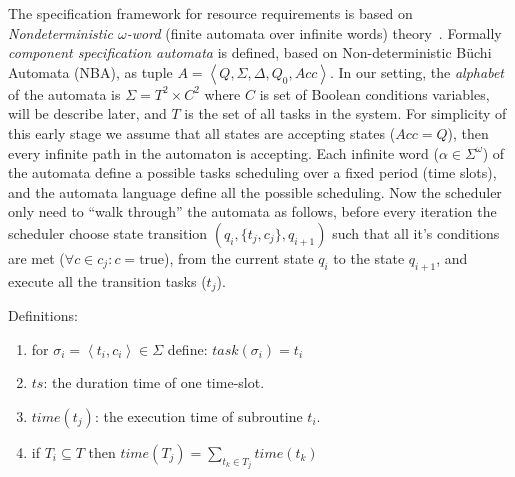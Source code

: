 \documentclass[ twoside, 12pt ]{article}
\begin{document}
{The specification framework for resource requirements is based on \textit{Nondeterministic $\omega$-word} (finite automata over infinite words) theory~\cite{???}.
Formally \textit{component specification automata} is defined, based on Non-deterministic B{\"u}chi Automata (NBA), as tuple $A= \left < Q,\Sigma,\Delta,Q_0,Acc \right > $.
In our setting, the \textit{alphabet} of the automata is $\Sigma = T^2 \times C^2$ where $C$ is set of Boolean conditions variables, will be describe later, and $T$ is the set of all tasks in the system.
For simplicity of this early stage we assume that all states are accepting states ($Acc=Q$), then every infinite path in the automaton is accepting.
Each infinite word ($\alpha \in \Sigma^\omega$) of the automata define a possible tasks scheduling over a fixed period (time slots), and the automata language define all the possible scheduling.
Now the scheduler only need to ``walk through'' the automata as follows, before every iteration the scheduler choose state transition $(q_i , \{t_j , c_j\}, q_{i+1})$ such that all it's conditions are met ($\forall c \in c_j : c = \text{true}$), from the current state $q_i$ to the state $q_{i+1}$, and execute all the transition tasks ($t_j$).


Definitions:
\begin{enumerate}
    \item for $\sigma_i = \left < t_i,c_i \right > \in \Sigma$ define: $task(\sigma_i) = t_i$ 
    \item $ts$: the duration time of one time-slot.
    \item $time(t_j)$: the execution time of subroutine $t_i$.
    \item if $T_i \subseteq T$ then $time(T_j) = \sum_{t_k \in T_j} time(t_k)$
\end{enumerate}



}
\end{document}
